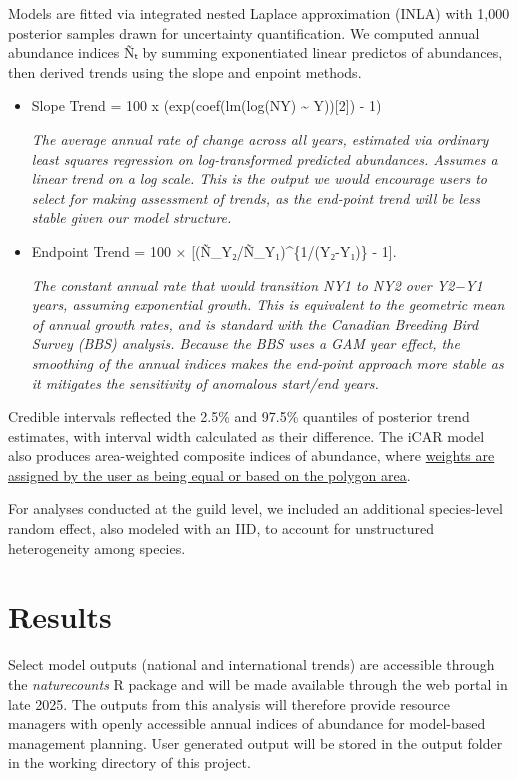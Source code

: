 \documentclass[
  letterpaper,
  DIV=11,
  numbers=noendperiod]{scrreprt}
\begin{document}
Models are fitted via integrated nested Laplace approximation (INLA)
with 1,000 posterior samples drawn for uncertainty quantification. We
computed annual abundance indices Ñₜ by summing exponentiated linear
predictos of abundances, then derived trends using the slope and enpoint
methods.

\begin{itemize}
\item
  Slope Trend = 100 x (exp(coef(lm(log(NY) \textasciitilde{} Y)){[}2{]})
  - 1)

  \emph{The average annual rate of change across all years, estimated
  via ordinary least squares regression on log-transformed predicted
  abundances. Assumes a linear trend on a log scale. This is the output
  we would encourage users to select for making assessment of trends, as
  the end-point trend will be less stable given our model structure.}
\item
  Endpoint Trend = 100 × {[}(Ñ\_Y₂/Ñ\_Y₁)\^{}\{1/(Y₂-Y₁)\} - 1{]}.

  \emph{The constant annual rate that would transition NY1 to NY2 over
  Y2−Y1 years, assuming exponential growth. This is equivalent to the
  geometric mean of annual growth rates, and is standard with the
  Canadian Breeding Bird Survey (BBS) analysis. Because the BBS uses a
  GAM year effect, the smoothing of the annual indices makes the
  end-point approach more stable as it mitigates the sensitivity of
  anomalous start/end years.}
\end{itemize}

Credible intervals reflected the 2.5\% and 97.5\% quantiles of posterior
trend estimates, with interval width calculated as their difference. The
iCAR model also produces area-weighted composite indices of abundance,
where \hyperref[3.1.1Analysis]{weights are assigned by the user as being
equal or based on the polygon area}.

For analyses conducted at the guild level, we included an additional
species-level random effect, also modeled with an IID, to account for
unstructured heterogeneity among species.

\section{Results}\label{1.3Intro}

Select model outputs (national and international trends) are accessible
through the \emph{naturecounts} R package and will be made available
through the web portal in late 2025. The outputs from this analysis will
therefore provide resource managers with openly accessible annual
indices of abundance for model-based management planning. User generated
output will be stored in the output folder in the working directory of
this project.
\end{document}
